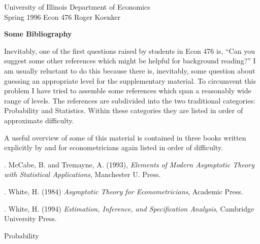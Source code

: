 \setlength{\textwidth}{170mm}
\setlength{\textheight}{220mm}
\setlength{\oddsidemargin}{0mm}
\setlength{\evensidemargin}{10mm}
\setlength{\topmargin}{-10mm}
\def\RR{\hbox{\raise.4ex\hbox{$\scriptstyle{|}$}\hskip-1.85pt R}}
\newcommand{\REF}{\nopagebreak\noindent{\large{\bf
      References}}\vspace{.2in}}

\newcommand{\Ref}[1]{\medskip\noindent\hangafter=1
      \hangindent=20pt\ignorespaces #1}
\pagestyle{empty}



\noindent
University of Illinois \hfill Department of Economics \\
Spring 1996 \hfill Econ 476 \hfill Roger Koenker

\vspace{4mm}
\begin{center}

\large{
{\bf Some Bibliography }}
\end{center}

\vspace{10mm}
Inevitably, one of the first questions raised by students in Econ 476 is, ``Can you suggest some other references which might be helpful for 
background reading?''  I am usually reluctant to do this because there is, 
inevitably, some question about guessing an appropriate level for the 
supplementary material.  To circumvent this problem I have tried to 
assemble some references which span a reasonably wide range of levels.  The
references are subdivided into the two traditional categories:  Probability 
and Statistics.  Within these categories they are listed in order of 
approximate difficulty.

A useful overview of some of this material is contained in three books
written explicitly by and for econometricians again listed in order of
difficulty.

\vspace{2mm}
\Ref 1.   McCabe, B. and Tremayne, A. (1993), {\it Elements of Modern
Asymptotic Theory with Statistical Applications}, Manchester U. Press.

\Ref 2.  White, H. (1984) {\it Asymptotic Theory for Econometricians},
Academic Press.

\Ref 3. White, H. (1994) {\it Estimation, Inference, and Specification Analysis},
Cambridge University Press.

\vspace{5mm}
\noindent
Probability

